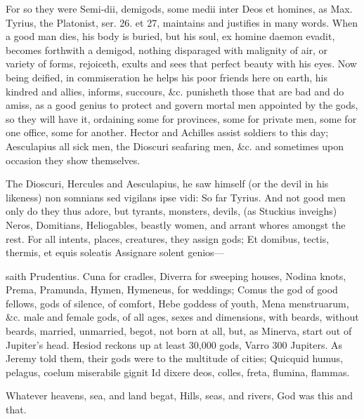 {For so they were Semi-dii, demigods, some medii inter Deos et homines,
as Max. Tyrius, the Platonist, ser. 26. et 27, maintains and
justifies in many words. When a good man dies, his body is buried, but
his soul, ex homine daemon evadit, becomes forthwith a demigod, nothing
disparaged with malignity of air, or variety of forms, rejoiceth,
exults and sees that perfect beauty with his eyes. Now being deified,
in commiseration he helps his poor friends here on earth, his kindred
and allies, informs, succours, \&c. punisheth those that are bad and do
amiss, as a good genius to protect and govern mortal men appointed by
the gods, so they will have it, ordaining some for provinces, some for
private men, some for one office, some for another. Hector and Achilles
assist soldiers to this day; Aesculapius all sick men, the Dioscuri
seafaring men, \&c. and sometimes upon occasion they show themselves.

The Dioscuri, Hercules and Aesculapius, he saw himself (or the devil in
his likeness) non somnians sed vigilans ipse vidi: So far Tyrius. And
not good men only do they thus adore, but tyrants, monsters, devils,
(as  Stuckius inveighs) Neros, Domitians, Heliogables, beastly
women, and arrant whores amongst the rest. For all intents, places,
creatures, they assign gods;
Et domibus, tectis, thermis, et equis soleatis
Assignare solent genios---

saith Prudentius. Cuna for cradles, Diverra for sweeping houses, Nodina
knots, Prema, Pramunda, Hymen, Hymeneus, for weddings; Comus the god of
good fellows, gods of silence, of comfort, Hebe goddess of youth, Mena
menstruarum, \&c. male and female gods, of all ages, sexes and
dimensions, with beards, without beards, married, unmarried, begot, not
born at all, but, as Minerva, start out of Jupiter's head. Hesiod
reckons up at least 30,000 gods, Varro 300 Jupiters. As Jeremy told
them, their gods were to the multitude of cities;
Quicquid humus, pelagus, coelum miserabile gignit
Id dixere deos, colles, freta, flumina, flammas.

Whatever heavens, sea, and land begat,
Hills, seas, and rivers, God was this and that.

}
